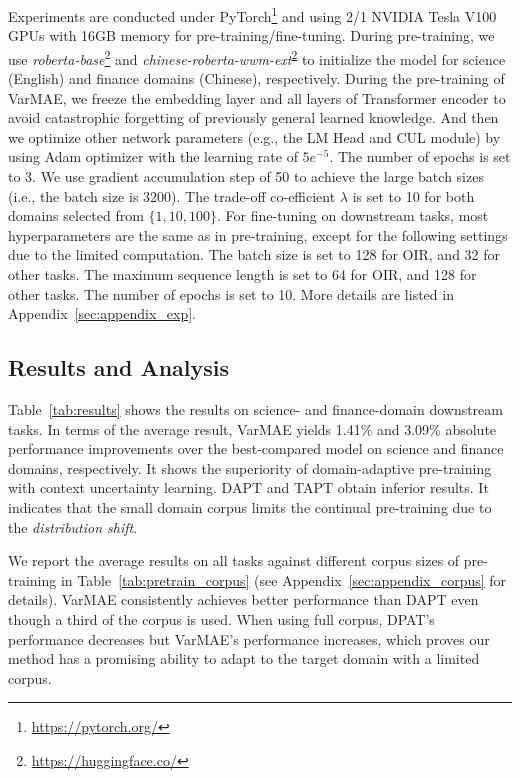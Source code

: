 \documentclass[11pt]{article}
\begin{document}
Experiments are conducted under PyTorch\footnote{\url{https://pytorch.org/}} and using 2/1 NVIDIA Tesla V100 GPUs with 16GB memory for pre-training/fine-tuning. 
During pre-training, we use 
\textit{roberta-base}\footnote{ \url{https://huggingface.co/}\label{code}} and
\textit{chinese-roberta-wwm-ext}\textsuperscript{\ref{code}} to initialize the model for science (English) and finance domains (Chinese), respectively.
During the pre-training of VarMAE, we freeze the embedding layer and all layers of Transformer encoder to avoid catastrophic forgetting \cite{DBLP:conf/nips/French93,DBLP:conf/emnlp/ArumaeSB20} of previously general learned knowledge. And then we optimize other network parameters (e.g., the LM Head and CUL module) by using Adam optimizer \cite{DBLP:journals/corr/KingmaB14} with the learning rate of $5e^{-5}$. 
The number of epochs is set to 3.
We use gradient accumulation step of 50 to achieve the large batch sizes (i.e., the batch size is 3200). The trade-off co-efficient $\lambda$ is set to 10 for both domains selected from $\{1, 10,  100 \}$.
For fine-tuning on downstream tasks, most hyperparameters are the same as in pre-training,  except for the following settings due to the limited computation. The batch size is set to 128 for OIR, and 32 for other tasks.
The maximum sequence length is set to 64 for OIR, and 128 for other tasks.
The number of epochs is set to 10.
More details are listed in Appendix~\ref{sec:appendix_exp}.






\subsection{Results and Analysis}
Table~\ref{tab:results} shows the results on science- and finance-domain downstream tasks.
In terms of the average result, VarMAE yields 1.41\% and 3.09\% absolute performance improvements over the best-compared model on science and finance domains, respectively. 
It shows the superiority of domain-adaptive pre-training with context uncertainty learning.
DAPT and TAPT obtain inferior results. 
It indicates that the small domain corpus limits the continual pre-training due to
the \textit{distribution shift}.




We report the average results on all tasks against different corpus sizes of pre-training in Table~\ref{tab:pretrain_corpus}  {(see Appendix~\ref{sec:appendix_corpus} for details)}. 
VarMAE consistently achieves better performance than DAPT even though a third of the corpus is used.
When using full corpus, DPAT's performance decreases but VarMAE's performance increases, which proves our method has a promising ability to adapt to the target domain with a limited corpus.
\end{document}
